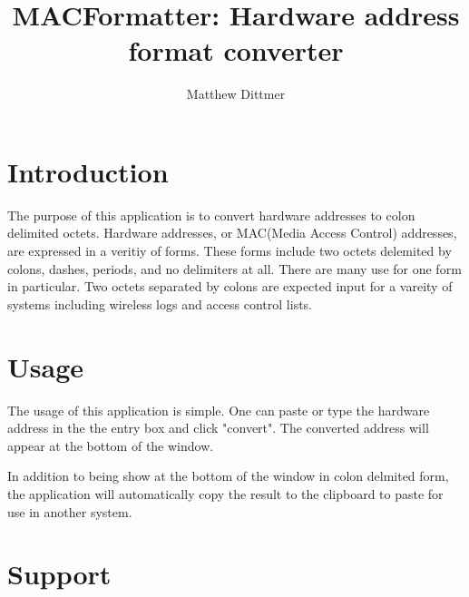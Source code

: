 \documentclass[10pt,a4paper,draft]{report}
\author{Matthew Dittmer}
\title{MACFormatter: Hardware address format converter}
\begin{document}
\maketitle
\chapter*{Introduction}

The purpose of this application is to convert hardware addresses to colon delimited octets.  Hardware addresses, or MAC(Media Access Control) addresses, are expressed in a veritiy of forms.  These forms include two octets delemited by colons, dashes, periods, and no delimiters at all.  There are many use for one form in particular.  Two octets separated by colons are expected input for a vareity of systems including wireless logs and access control lists.

\chapter*{Usage}

The usage of this application is simple.  One can paste or type the hardware address in the the entry box and click "convert".  The converted address will appear at the bottom of the window.

In addition to being show at the bottom of the window in colon delmited form, the application will automatically copy the result to the clipboard to paste for use in another system.

\chapter*{Support}
\end{document}
